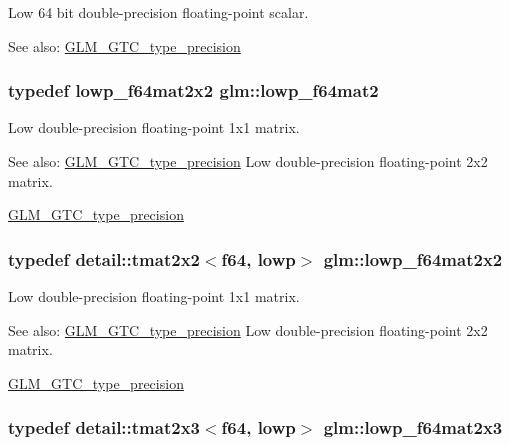 Low 64 bit double-precision floating-point scalar. \begin{Desc}
\item[See also:]\hyperlink{group__gtc__type__precision}{GLM\_\-GTC\_\-type\_\-precision} \end{Desc}
\hypertarget{group__gtc__type__precision_g2984b3b0b6ee0657044d186bb875b4e3}{
\subsubsection[lowp\_\-f64mat2]{\setlength{\rightskip}{0pt plus 5cm}typedef lowp\_\-f64mat2x2 {\bf glm::lowp\_\-f64mat2}}}
\label{group__gtc__type__precision_g2984b3b0b6ee0657044d186bb875b4e3}


Low double-precision floating-point 1x1 matrix. \begin{Desc}
\item[See also:]\hyperlink{group__gtc__type__precision}{GLM\_\-GTC\_\-type\_\-precision} Low double-precision floating-point 2x2 matrix. 

\hyperlink{group__gtc__type__precision}{GLM\_\-GTC\_\-type\_\-precision} \end{Desc}
\hypertarget{group__gtc__type__precision_g38e41c5332b4eb20b23b4ed1f06608d4}{
\subsubsection[lowp\_\-f64mat2x2]{\setlength{\rightskip}{0pt plus 5cm}typedef detail::tmat2x2$<$f64, lowp$>$ {\bf glm::lowp\_\-f64mat2x2}}}
\label{group__gtc__type__precision_g38e41c5332b4eb20b23b4ed1f06608d4}


Low double-precision floating-point 1x1 matrix. \begin{Desc}
\item[See also:]\hyperlink{group__gtc__type__precision}{GLM\_\-GTC\_\-type\_\-precision} Low double-precision floating-point 2x2 matrix. 

\hyperlink{group__gtc__type__precision}{GLM\_\-GTC\_\-type\_\-precision} \end{Desc}
\hypertarget{group__gtc__type__precision_g2add7d48faba102f53fbad2e14dfed12}{
\subsubsection[lowp\_\-f64mat2x3]{\setlength{\rightskip}{0pt plus 5cm}typedef detail::tmat2x3$<$f64, lowp$>$ {\bf glm::lowp\_\-f64mat2x3}}}
\label{group__gtc__type__precision_g2add7d48faba102f53fbad2e14dfed12}


